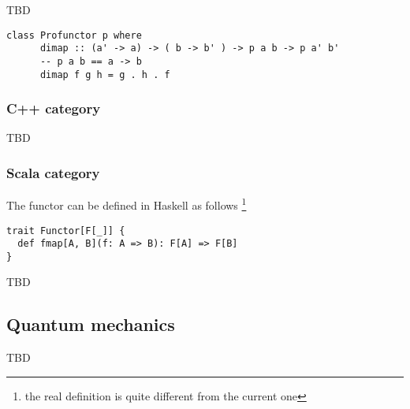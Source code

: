 \begin{example}
\label{ex:contravariant_functor_hask}
TBD
\begin{verbatim}
class Profunctor p where
      dimap :: (a' -> a) -> ( b -> b' ) -> p a b -> p a' b'
      -- p a b == a -> b
      dimap f g h = g . h . f
\end{verbatim}
\end{example}


\subsubsection{\textbf{C++} category}
TBD

\subsubsection{\textbf{Scala} category}
The functor can be defined in Haskell as follows
\footnote{the real definition is quite different from the current one}
\begin{example}
\label{ex:functor_scala}
\begin{verbatim}
trait Functor[F[_]] {
  def fmap[A, B](f: A => B): F[A] => F[B]
}\end{verbatim} 
\end{example}

TBD

\subsection{Quantum mechanics}

TBD
